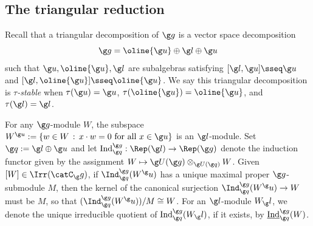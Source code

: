 \documentclass[12pt]{amsart}
\begin{document}
\subsection{The triangular reduction}
\label{subsec:hyperb}
Recall that a triangular decomposition of $\g g$ is a vector space decomposition 
\begin{equation}
\label{eq:triang-decompo}
\g g=\oline{\g u}\oplus \g l\oplus \g u
\end{equation}
such that $\g u,\oline{\g u},\g l$ are subalgebras satisfying $[\g l,\g u]\sseq \g u$ and $[\g l,\oline{\g u}]\sseq \oline{\g u}$. We say this triangular decomposition is \emph{$\tau$-stable} when  $\tau(\g u)=\g u$, $\tau(\oline{\g u})=\oline{\g u}$, and $\tau(\g l)=\g l$. 

For any $\g g$-module $W$, the subspace  $W^{\g u}:=\left\{w\in W\,:\,x\cdot w=0\text{ for all }x\in\g u\right\}$ is an $\g l$-module. Set $\g q:=\g l\oplus\g u$ and let $
\mathrm{Ind}_{\g q}^{\g g}:\Rep(\g l)\to\Rep(\g g)$ denote the induction functor given by the assignment $
W\mapsto \g U(\g g)\otimes_{\g U(\g q)} W$. Given $[W]\in\Irr(\catC_\g g)$, if $\Ind_{\g q}^{\g g}(W^\g u)$  has a unique maximal proper $\g g$-submodule $M$, then the kernel of the canonical surjection 
$\Ind_{\g q}^{\g g}(W^\g u)\to W$ must be $M$, so that  $(\Ind_{\g q}^{\g g}(W^\g u))/M\cong W$.
For an $\g l$-module $W_\g l$, 
we denote the unique irreducible quotient of  
$\mathrm{Ind}_{\g q}^{\g g}
(W_\g l)$, if it exists, 
by 
$\underline{\mathrm{Ind}}_{\g q}^{\g g}
(W)$. 
\end{document}

